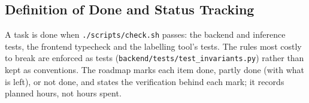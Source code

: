 
\subsection{Definition of Done and Status Tracking}
\label{subsec:done}

A task is done when \texttt{./scripts/check.sh} passes: the backend
and inference tests, the frontend typecheck and the labelling tool's
tests. The rules most costly to break are enforced as tests
(\texttt{backend/tests/test\_invariants.py}) rather than kept as
conventions. The roadmap marks each item done, partly done (with
what is left), or not done, and states the verification behind each
mark; it records planned hours, not hours spent.
